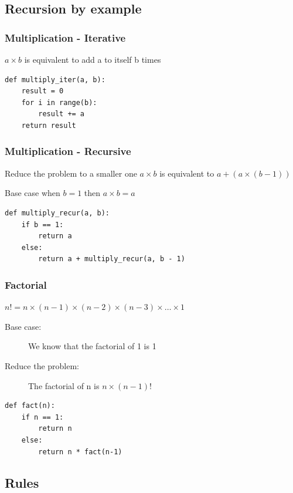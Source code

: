 \documentclass[11pt]{beamer}
\begin{document}
\subsection{Recursion by example}

\begin{frame}[fragile]\frametitle{Multiplication - Iterative}
\begin{block}{}
\centering $a \times b$ is equivalent to add a to itself b times
\end{block}
\begin{lstlisting}
def multiply_iter(a, b):
	result = 0
	for i in range(b):
		result += a
	return result
\end{lstlisting}
\end{frame}

\begin{frame}[fragile]\frametitle{Multiplication - Recursive}
\begin{block}{Reduce the problem to a smaller one}
\centering $a \times b$ is equivalent to $a + (a  \times (b - 1))$
\end{block}
\begin{block}{Base case}
\centering when $b = 1$ then $a \times b = a$
\end{block}
\pause
\begin{lstlisting}
def multiply_recur(a, b):
	if b == 1:
		return a
	else:
		return a + multiply_recur(a, b - 1)
\end{lstlisting}
\end{frame}

\begin{frame}[fragile]\frametitle{Factorial}
\begin{block}{}
\centering $n! = n \times (n - 1) \times (n - 2) \times (n - 3) \times \ldots \times 1$
\end{block}
\begin{description}
\item[Base case:] We know that the factorial of 1 is 1
\item[Reduce the problem:] The factorial of n is $n \times (n - 1)!$
\end{description}
\pause
\begin{lstlisting}
def fact(n):
	if n == 1:
		return n
	else:
		return n * fact(n-1)
\end{lstlisting}
\end{frame}

\subsection{Rules}
\end{document}
